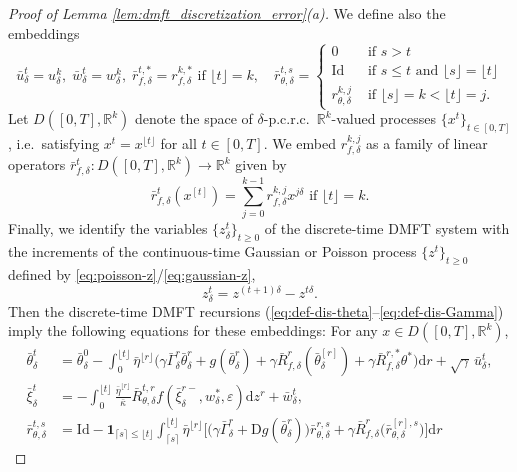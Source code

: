 \documentclass[11pt,letterpaper,reqno]{amsart}
\theoremstyle{definition}
\def\eps{\varepsilon}
\def\d{\mathrm{d}}
\def\D{\mathrm{D}}
\def\R{\mathbb{R}}
\def\Id{\mathrm{Id}}
\newcommand{\flr}[1]{{\lfloor {#1} \rfloor}}
\newcommand{\cil}[1]{{\lceil {#1} \rceil}}
\begin{document}
\begin{proof}[Proof of Lemma \ref{lem:dmft_discretization_error}(a)]
We define also the embeddings
\begin{equation}\label{eq:embeddings2}
\bar u_\delta^t=u_\delta^k,
\;\bar w_\delta^t=w_\delta^k,
\;\bar r_{f,\delta}^{t,*}=r_{f,\delta}^{k,*} \text{ if } \flr{t}=k,
\quad
\bar r_{\theta,\delta}^{t,s}=\begin{cases} 0 & \text{ if } s>t \\
\Id & \text{ if } s \leq t \text{ and } \flr{s}=\flr{t} \\
r_{\theta,\delta}^{k,j} & \text{ if } \flr{s}=k<\flr{t}=j.\end{cases}
\end{equation}
Let $D([0,T],\R^k)$ denote the space of $\delta$-p.c.r.c.\ $\R^k$-valued
processes $\{x^t\}_{t \in [0,T]}$, i.e.\ satisfying $x^t=x^{\flr{t}}$
for all $t \in [0,T]$. We embed
$r_{f,\delta}^{k,j}$ as a family of linear operators
$\bar r_{f,\delta}^t:D([0,T],\R^k) \to \R^k$ given by
\begin{equation}\label{eq:rfembed}
\bar r_{f,\delta}^t(x^{[t]})
=\sum_{j=0}^{k-1} r_{f,\delta}^{k,j}x^{j\delta} \text{ if } \flr{t}=k.
\end{equation}
Finally, we identify the variables $\{z_\delta^t\}_{t \geq 0}$ of the
discrete-time DMFT system with the increments of the continuous-time Gaussian
or Poisson process $\{z^t\}_{t \geq 0}$ defined by
\eqref{eq:poisson-z}/\eqref{eq:gaussian-z},
\[z_\delta^t=z^{(t+1)\delta}-z^{t\delta}.\]
Then the discrete-time DMFT recursions
(\ref{eq:def-dis-theta}--\ref{eq:def-dis-Gamma})
imply the following equations for these embeddings:
For any $x \in D([0,T],\R^k)$,
\begin{align}
\bar\theta^t_\delta&=\bar\theta^0_\delta-\int_0^{\flr{t}} \bar\eta^{\flr{r}} \Big({\gamma}\bar\Gamma^r_\delta
\bar\theta^r_\delta+g(\bar\theta^r_\delta)+{\gamma}\bar R_{f,\delta}^r(\bar\theta^{[r]}_\delta)+
{\gamma}\bar R_{f,\delta}^{r,*}\theta^*\Big)\d r+\sqrt{\gamma}\,\bar u^t_\delta,
\label{eq:def-dist-theta}\\
\bar\xi^t_\delta&={-}\int_0^{\flr{t}} \frac{\bar\eta^{\flr{r}}}{\bar\kappa} \bar R_{\theta,\delta}^{t,r}
f(\bar\xi^{r-}_\delta,w_\delta^*,\eps)\d z^r+\bar
w^t_\delta,\label{eq:def-dist-xi}\\
\bar r_{\theta,\delta}^{t,s}&=\Id- 
\mathbf{1}_{\cil{s} \leq \flr{t}} \int_{\cil{s}}^{\flr{t}} \bar\eta^{\flr{r}}\bigg[\Big({\gamma}\bar\Gamma^r_\delta+\D
g(\bar\theta^r_\delta)\Big)\bar r_{\theta,\delta}^{r,s}+{\gamma}
\bar R_{f,\delta}^r\Big(\bar r_{\theta,\delta}^{[r],s}\Big)\bigg]\d r

\end{align}
\end{proof}
\end{document}
